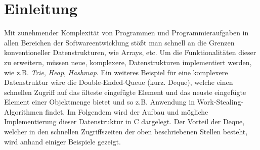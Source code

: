 \documentclass{TUBAFarbeiten}
\begin{document}
\maketitle
\tableofcontents
\newpage
\section{Einleitung}
Mit zunehmender Komplexität von Programmen und Programmieraufgaben in allen Bereichen der Softwareentwicklung stößt man schnell an die Grenzen konventioneller Datenstrukturen, wie Arrays, etc. Um die Funktionalitäten dieser zu erweitern, müssen neue, komplexere, Datenstrukturen implementiert werden, wie z.B. \textit{Trie}, \textit{Heap}, \textit{Hashmap}. 
\newline Ein weiteres Beispiel für eine komplexere Datenstruktur wäre die Double-Ended-Queue (kurz. Deque), welche einen schnellen Zugriff auf das älteste eingefügte Element und das neuste eingefügte Element einer Objektmenge bietet und so z.B. Anwendung in Work-Stealing-Algorithmen findet.
Im Folgendem wird der Aufbau und mögliche Implementierung dieser Datenstruktur in C dargelegt. Der Vorteil der Deque, welcher in den schnellen Zugriffszeiten der oben beschriebenen Stellen besteht, wird anhand einiger Beispiele gezeigt.    
\end{document}
